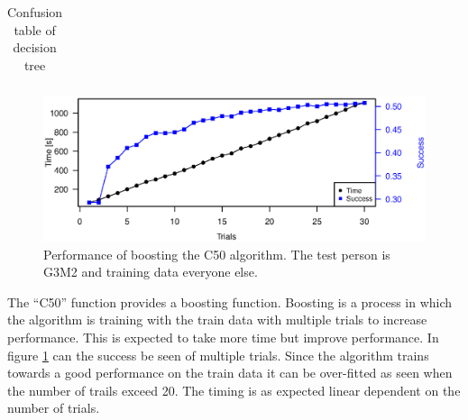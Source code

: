 \begin{table}[H]
    \centering
    \begin{subtable}{0.005\textwidth}
    \end{subtable}
    \begin{subtable}{0.8\textwidth}
        \centering
    \end{subtable}

    \begin{subtable}{0.005\textwidth}
        \flushright
    \end{subtable}
    \begin{subtable}{0.8\textwidth}
        \begin{subtable}{\textwidth}
            \centering
            \begin{tabular}{*{11}{c}}
                
            \end{tabular}
            \caption{Confusion table of decision tree}
            \label{tb:tree_confus}
        \end{subtable}
    \end{subtable}
\end{table}

\begin{figure}[h]
\includegraphics[width = \textwidth]{graphics/tree_timing_entropy}
\caption{Performance of boosting the C50 algorithm. The test person is G3M2 and training data everyone else.}
\label{fig:tree_timing}
\end{figure}

The ``C50'' function provides a boosting function.
Boosting is a process in which the algorithm is training with the train data with multiple trials to increase performance.
This is expected to take more time but improve performance.
In figure \ref{fig:tree_timing} can the success be seen of multiple trials.
Since the algorithm trains towards a good performance on the train data it can be over-fitted as seen when the number of trails exceed 20. 
The timing is as expected linear dependent on the number of trials.

